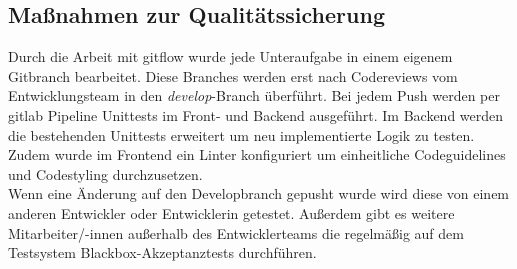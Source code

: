 \subsection{Maßnahmen zur Qualitätssicherung}
\label{qualitaetssicherung}
Durch die Arbeit mit \gls{gitflow} wurde jede Unteraufgabe in einem eigenem Gitbranch bearbeitet. Diese Branches werden erst nach Codereviews vom Entwicklungsteam in den \textit{develop}-Branch überführt. Bei jedem Push werden per \gls{gitlab} Pipeline Unittests im Front- und Backend ausgeführt. Im Backend werden die bestehenden Unittests erweitert um neu implementierte Logik zu testen. Zudem wurde im Frontend ein \gls{Linter} konfiguriert um einheitliche Codeguidelines und Codestyling durchzusetzen.\\
Wenn eine Änderung auf den Developbranch gepusht wurde wird diese von einem anderen Entwickler oder Entwicklerin getestet. Außerdem gibt es weitere Mitarbeiter/-innen außerhalb des Entwicklerteams die regelmäßig auf dem Testsystem Blackbox-Akzeptanztests durchführen.
